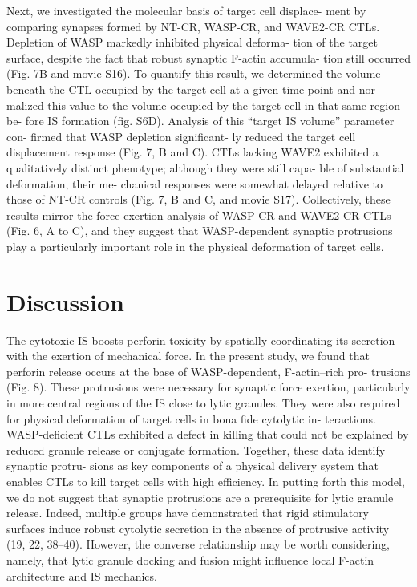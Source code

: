 Next, we investigated the molecular basis of target cell displace- ment by comparing synapses formed by NT-CR, WASP-CR, and WAVE2-CR CTLs. Depletion of WASP markedly inhibited physical deforma- tion of the target surface, despite the fact that robust synaptic F-actin accumula- tion still occurred (Fig. 7B and movie S16). To quantify this result, we determined the volume beneath the CTL occupied by the target cell at a given time point and nor- malized this value to the volume occupied by the target cell in that same region be- fore IS formation (fig. S6D). Analysis of this “target IS volume” parameter con- firmed that WASP depletion significant- ly reduced the target cell displacement response (Fig. 7, B and C). CTLs lacking WAVE2 exhibited a qualitatively distinct phenotype; although they were still capa- ble of substantial deformation, their me- chanical responses were somewhat delayed relative to those of NT-CR controls (Fig. 7, B and C, and movie S17). Collectively, these results mirror the force exertion analysis of WASP-CR and WAVE2-CR CTLs (Fig. 6, A to C), and they suggest that WASP-dependent synaptic protrusions play a particularly important role in the physical deformation of target cells.

\section{Discussion}
The cytotoxic IS boosts perforin toxicity by spatially coordinating its secretion with the exertion of mechanical force. In the present study, we found that perforin release occurs at the base of WASP-dependent, F-actin–rich pro- trusions (Fig. 8). These protrusions were necessary for synaptic force exertion, particularly in more central regions of the IS close to lytic granules. They were also required for physical deformation of target cells in bona fide cytolytic in- teractions. WASP-deficient CTLs exhibited a defect in killing that could not be explained by reduced granule release or conjugate formation. Together, these data identify synaptic protru- sions as key components of a physical delivery system that enables CTLs to kill target cells with high efficiency. In putting forth this model, we do not suggest that synaptic protrusions are a prerequisite for lytic granule release. Indeed, multiple groups have demonstrated that rigid stimulatory surfaces induce robust cytolytic secretion in the absence of protrusive activity (19, 22, 38–40). However, the converse relationship may be worth considering, namely, that lytic granule docking and fusion might influence local F-actin architecture and IS mechanics.

